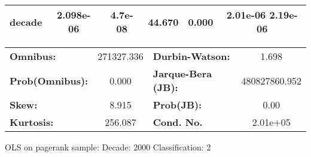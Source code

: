 \begin{center}
\begin{tabular}{lccccc}
\textbf{decade}             &    2.098e-06  &      4.7e-08     &    44.670  &         0.000        &      2.01e-06  2.19e-06       \\
\bottomrule
\end{tabular}
\begin{tabular}{lclc}
\textbf{Omnibus:}       & 271327.336 & \textbf{  Durbin-Watson:     } &       1.698    \\
\textbf{Prob(Omnibus):} &    0.000   & \textbf{  Jarque-Bera (JB):  } & 480827860.952  \\
\textbf{Skew:}          &    8.915   & \textbf{  Prob(JB):          } &        0.00    \\
\textbf{Kurtosis:}      &  256.087   & \textbf{  Cond. No.          } &    2.01e+05    \\
\bottomrule
\end{tabular}
\end{center}
\break
OLS on pagerank sample: Decade: 2000 Classification: 2

